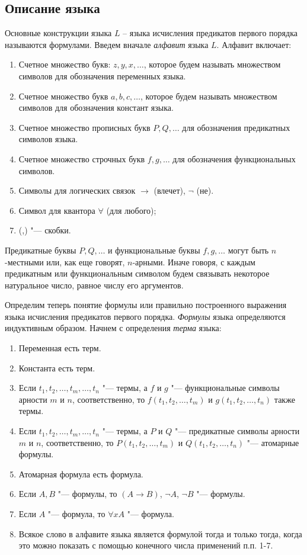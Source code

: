 \documentclass[b5paper,11pt]{book}
\numberwithin{Def}{section}
\numberwithin{Th}{chapter}
\numberwithin{St}{chapter}
\begin{document}
	\subsection{Описание языка}\label{LangDescr}
	Основные конструкции языка $L$ – языка исчисления предикатов первого порядка называются формулами. Введем вначале \textit{алфавит} языка $L$. Алфавит включает:
	\begin{enumerate}
		\item Счетное множество букв: $z,y,x,\dots$, которое будем называть множеством символов для обозначения переменных языка.
		\item Счетное множество букв $a,b,c,\dots$, которое будем называть множеством символов для обозначения констант языка.
		\item Счетное множество прописных букв $P,Q,\dots$ для обозначения предикатных символов языка.
		\item Счетное множество строчных букв $f,g,\dots$ для обозначения функциональных символов.
		\item Символы для логических связок $\rightarrow$ (влечет), $\neg$ (не).
		\item Символ для квантора $\forall$ (для любого);
		\item (,) "--- скобки.
	\end{enumerate}
	
	Предикатные буквы $P,Q,\dots$ и функциональные буквы $f,g,\dots$ могут быть $n$-местными или, как еще говорят, $n$-арными. Иначе говоря, с каждым предикатным или функциональным символом будем связывать некоторое натуральное число, равное числу его аргументов.
	
	Определим теперь понятие формулы или правильно построенного выражения языка исчисления предикатов первого порядка. \textit{Формулы} языка определяются индуктивным образом. Начнем с определения \textit{терма} языка:
	\begin{enumerate}
		\item Переменная есть терм.
		\item Константа есть терм.
		\item Если $t_1,t_2,\dots,t_m,\dots,t_n$ "--- термы, а $f$ и $g$ "--- функциональные символы арности $m$ и $n$, соответственно, то  $f(t_1,t_2,\dots,t_m)$ и $g(t_1,t_2,\dots,t_n)$ также термы.
		\item Если $t_1,t_2,\dots,t_m,\dots,t_n$ "--- термы, а $P$ и $Q$ "--- предикатные символы арности $m$ и $n$, соответственно, то $P(t_1,t_2,\dots,t_m)$ и $Q(t_1,t_2,\dots,t_n)$ "--- атомарные формулы.
		\item Атомарная формула есть формула.
		\item Если $A,B$ "--- формулы, то $(A\rightarrow B)$, $\neg A$, $\neg B$ "--- формулы.
		\item Если $A$ "--- формула, то $\forall x A$ "--- формула.
		\item Всякое слово в алфавите языка является формулой тогда и только тогда, когда это можно показать с помощью конечного числа применений п.п. 1-7.
	\end{enumerate}
\end{document}

